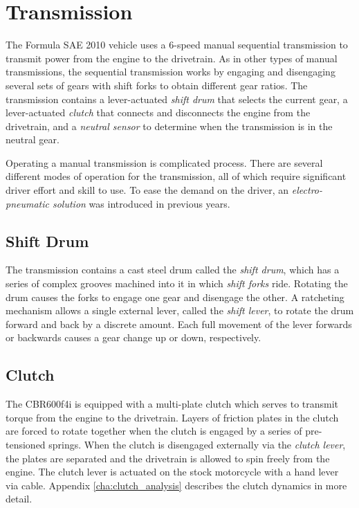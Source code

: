 \section{Transmission\label{sec:background_transmission}}

The Formula SAE 2010 vehicle uses a 6-speed manual sequential transmission to transmit power from the engine to the drivetrain. As in other types of manual transmissions, the sequential transmission works by engaging and disengaging several sets of gears with shift forks to obtain different gear ratios. The transmission contains a lever-actuated \emph{shift drum} that selects the current gear, a lever-actuated \emph{clutch} that connects and disconnects the engine from the drivetrain, and a \emph{neutral sensor} to determine when the transmission is in the neutral gear. 

Operating a manual transmission is complicated process. There are several different modes of operation for the transmission, all of which require significant driver effort and skill to use. To ease the demand on the driver, an \emph{electro-pneumatic solution} was introduced in previous years.

\subsection{Shift Drum}
\label{sec:background_trans_shiftdrum}

The transmission contains a cast steel drum called the \emph{shift drum}, which has a series of complex grooves machined into it in which \emph{shift forks} ride. Rotating the drum causes the forks to engage one gear and disengage the other. A ratcheting mechanism allows a single external lever, called the \emph{shift lever}, to rotate the drum forward and back by a discrete amount. Each full movement of the lever forwards or backwards causes a gear change up or down, respectively. 

\subsection{Clutch}

The CBR600f4i is equipped with a multi-plate clutch which serves to transmit torque from the engine to the drivetrain. Layers of friction plates in the clutch are forced to rotate together when the clutch is engaged by a series of pre-tensioned springs. When the clutch is disengaged externally via the \emph{clutch lever}, the plates are separated and the drivetrain is allowed to spin freely from the engine. The clutch lever is actuated on the stock motorcycle with a hand lever via cable. Appendix \ref{cha:clutch_analysis} describes the clutch dynamics in more detail.

